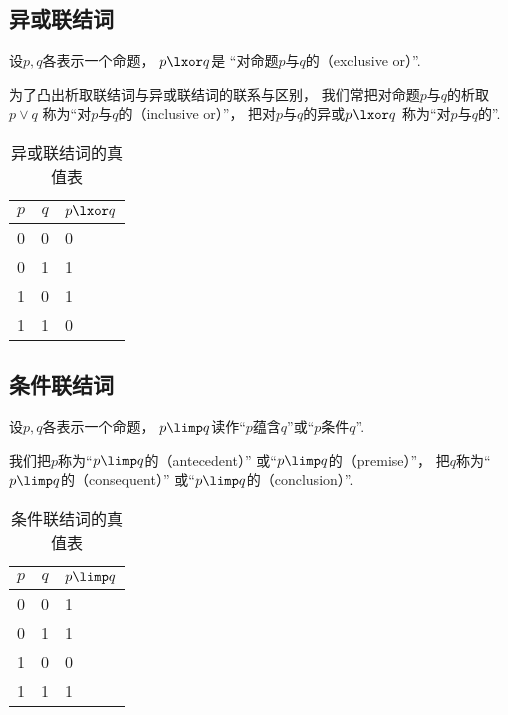 \subsection{异或联结词}
设\(p,q\)各表示一个命题，
\(p \lxor q\)是
“对命题\(p\)与\(q\)的（exclusive or）”.

为了凸出析取联结词与异或联结词的联系与区别，
我们常把对命题\(p\)与\(q\)的析取\(p \lor q\)
称为“对\(p\)与\(q\)的（inclusive or）”，
把对\(p\)与\(q\)的异或\(p \lxor q\)
称为“对\(p\)与\(q\)的”.

\begin{table}[ht]
	\centering
	\begin{tabular}{|*{2}{c|}p{2cm}|}
		\hline
		\(p\) & \(q\) & \(p \lxor q\) \\
		\hline
		0 & 0 & 0 \\
		0 & 1 & 1 \\
		1 & 0 & 1 \\
		1 & 1 & 0 \\
		\hline
	\end{tabular}
	\caption{异或联结词的真值表}
\end{table}

\subsection{条件联结词}
设\(p,q\)各表示一个命题，
\(p \limp q\)读作“\(p\)蕴含\(q\)”或“\(p\)条件\(q\)”.

我们把\(p\)称为“\(p \limp q\)的（antecedent）”
或“\(p \limp q\)的（premise）”，
把\(q\)称为“\(p \limp q\)的（consequent）”
或“\(p \limp q\)的（conclusion）”.

\begin{table}[ht]
	\centering
	\begin{tabular}{|*{2}{c|}p{2cm}|}
		\hline
		\(p\) & \(q\) & \(p \limp q\) \\
		\hline
		0 & 0 & 1 \\
		0 & 1 & 1 \\
		1 & 0 & 0 \\
		1 & 1 & 1 \\
		\hline
	\end{tabular}
	\caption{条件联结词的真值表}
\end{table}

